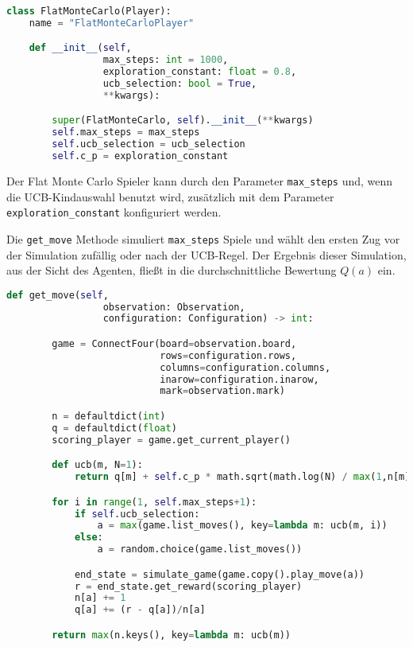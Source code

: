 \begin{lstlisting}[language=Python,caption=Flache Monte Carlo Suche.,label={lst:flat-mc}]
class FlatMonteCarlo(Player):
    name = "FlatMonteCarloPlayer"

    def __init__(self,
                 max_steps: int = 1000,
                 exploration_constant: float = 0.8,
                 ucb_selection: bool = True,
                 **kwargs):

        super(FlatMonteCarlo, self).__init__(**kwargs)
        self.max_steps = max_steps
        self.ucb_selection = ucb_selection
        self.c_p = exploration_constant

\end{lstlisting}

Der Flat Monte Carlo Spieler kann durch den Parameter \verb|max_steps| und, wenn die UCB-Kindauswahl benutzt wird, zusätzlich mit dem Parameter \verb|exploration_constant| konfiguriert werden.

Die \texttt{get\_move} Methode simuliert \verb|max_steps| Spiele und wählt den ersten Zug vor der Simulation zufällig oder nach der UCB-Regel.
Der Ergebnis dieser Simulation, aus der Sicht des Agenten, fließt in die durchschnittliche Bewertung $Q(a)$ ein.

\begin{lstlisting}[language=Python]
    def get_move(self,
                 observation: Observation,
                 configuration: Configuration) -> int:

        game = ConnectFour(board=observation.board,
                           rows=configuration.rows,
                           columns=configuration.columns,
                           inarow=configuration.inarow,
                           mark=observation.mark)

        n = defaultdict(int)
        q = defaultdict(float)
        scoring_player = game.get_current_player()

        def ucb(m, N=1):
            return q[m] + self.c_p * math.sqrt(math.log(N) / max(1,n[m]))

        for i in range(1, self.max_steps+1):
            if self.ucb_selection:
                a = max(game.list_moves(), key=lambda m: ucb(m, i))
            else:
                a = random.choice(game.list_moves())

            end_state = simulate_game(game.copy().play_move(a))
            r = end_state.get_reward(scoring_player)
            n[a] += 1
            q[a] += (r - q[a])/n[a]

        return max(n.keys(), key=lambda m: ucb(m))
\end{lstlisting}

